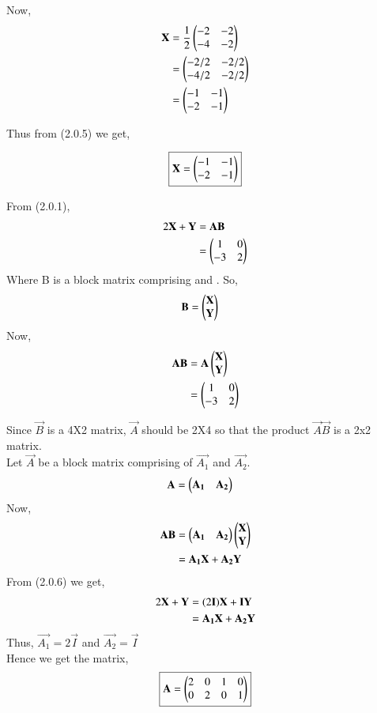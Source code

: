 \documentclass[journal,12pt,twocolumn]{IEEEtran}
\begin{document}
Now, 
\begin{align}
\vec{X} &= \frac{1}{2}\myvec{-2 & -2 \\ -4 & -2 } \\
&= \myvec{-2/2 & -2/2 \\ -4/2 & -2/2 }\notag \\
&= \myvec{-1 & -1 \\ -2 & -1}
\end{align}

Thus from (2.0.5) we get, 

\begin{align*}
    \boxed{ \vec{X} = \myvec{-1 & -1 \\ -2 & -1} }
\end{align*}

From (2.0.1), 
\begin{align}
    2\vec{X}+\vec{Y} &=\vec{A}\vec{B} \\
    &= \myvec{1 & 0 \\ -3 & 2}
\end{align}
Where B is a block matrix comprising  and . So, 
\begin{align}
    \vec{B} &= \myvec{\vec{X} \\ \vec{Y}}
\end{align}
Now, 
\begin{align}
    \vec{A}\vec{B} &= \vec{A}\myvec{\vec{X} \\ \vec{Y}} \notag\\
    &= \myvec{1 & 0 \\ -3 & 2} 
\end{align}

Since $\vec{B}$ is a 4X2 matrix, $\vec{A}$ should be 2X4 so that the product $\vec{A}\vec{B}$ is a 2x2 matrix.\\ 
Let $\vec{A}$ be a block matrix comprising of $\vec{A_{1}}$ and
$\vec{A_{2}}$. 
\begin{align}
    \vec{A} &= \myvec{\vec{A_{1}}& \vec{A_{2}}}
\end{align}
Now, 
\begin{align}
    \vec{A}\vec{B} &= \myvec{\vec{A_{1}}& \vec{A_{2}}}\myvec{\vec{X} \\ \vec{Y}}\notag\\
    &= \vec{A_{1}}\vec{X} + \vec{A_{2}}\vec{Y}
\end{align}
From (2.0.6) we get, 
\begin{align}
    2\vec{X}+\vec{Y} &= (2\vec{I})\vec{X} + \vec{I}\vec{Y}\notag\\
    &=\vec{A_{1}}\vec{X} + \vec{A_{2}}\vec{Y}
\end{align}
Thus, $\vec{A_{1}} = 2\vec{I}$ and $\vec{A_{2}} = \vec{I}$ \\
Hence we get the matrix, 
\begin{align*}
    \boxed{\vec{A} =  \myvec{2 & 0 & 1 & 0 \\ 0 & 2 & 0 & 1}}
\end{align*}
\end{document}
